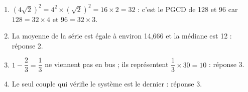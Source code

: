 \begin{enumerate}
\item $\left(4\sqrt{2} \right)^2 = 4^2 \times \left(\sqrt{2} \right)^2 = 16 \times 2 = 32$ : c'est le PGCD de 128 et 96 car $128 = 32 \times 4$ et $96 = 32 \times 3$.
\item La moyenne de la série est égale à environ 14,666 et la médiane est 12 : réponse 2.
\item $1 - \dfrac{2}{3} = \dfrac{1}{3}$ ne viennent pas en bus  ; ils représentent $\dfrac{1}{3} \times 30 = 10$ : réponse 3.
\item Le seul couple qui vérifie le système est le dernier : réponse 3.
\end{enumerate}

\vspace{0.25cm}

